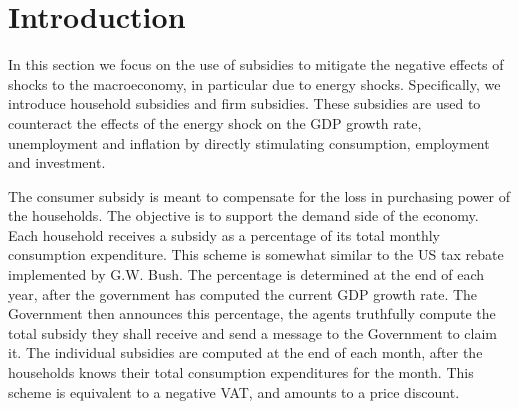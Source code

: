 \section{Introduction}

In this section we focus on the use of subsidies to mitigate the negative
effects of shocks to the macroeconomy, in particular due to energy shocks.
Specifically, we introduce household subsidies and firm subsidies. These
subsidies are used to counteract the effects of the energy shock on the GDP
growth rate, unemployment and inflation by directly stimulating consumption,
employment and investment.

\bigskip The consumer subsidy is meant to compensate for the loss in
purchasing power of the households. The objective is to support the demand
side of the economy. Each household receives a subsidy as a percentage of
its total monthly consumption expenditure. This scheme is somewhat similar
to the US tax rebate implemented by G.W. Bush. The percentage is determined
at the end of each year, after the government has computed the current GDP
growth rate. The Government then announces this percentage, the agents
truthfully compute the total subsidy they shall receive and send a message
to the Government to claim it. The individual subsidies are computed at the
end of each month, after the households knows their total consumption
expenditures for the month. This scheme is equivalent to a negative VAT, and
amounts to a price discount.

